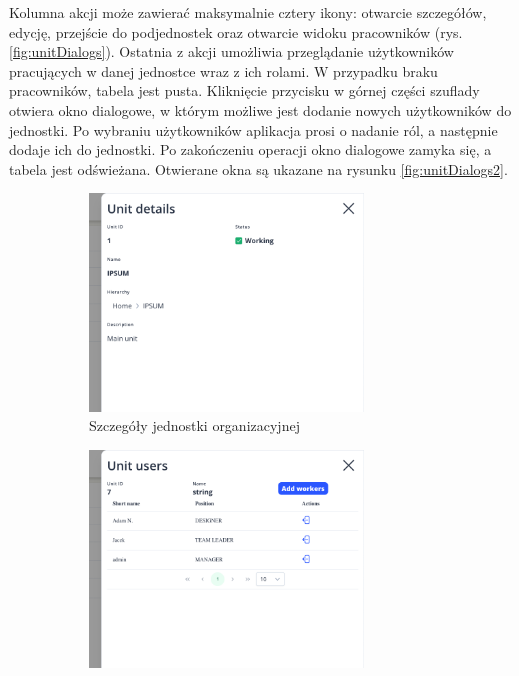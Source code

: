 Kolumna akcji może zawierać maksymalnie cztery ikony: otwarcie szczegółów, edycję, przejście do podjednostek oraz otwarcie widoku pracowników (rys. \ref{fig:unitDialogs}). Ostatnia z akcji umożliwia przeglądanie użytkowników pracujących w danej jednostce wraz z ich rolami. W przypadku braku pracowników, tabela jest pusta. Kliknięcie przycisku w górnej części szuflady otwiera okno dialogowe, w którym możliwe jest dodanie nowych użytkowników do jednostki. Po wybraniu użytkowników aplikacja prosi o nadanie ról, a następnie dodaje ich do jednostki. Po zakończeniu operacji okno dialogowe zamyka się, a tabela jest odświeżana. Otwierane okna są ukazane na rysunku \ref{fig:unitDialogs2}.

\begin{figure}[H]
    \centering
    \begin{subfigure}[b]{0.49\textwidth}
        \centering
        \includegraphics[width=0.8\textwidth, frame]{graf/front/unitDetails.png}
        \caption{Szczegóły jednostki organizacyjnej}
    \end{subfigure}
    \begin{subfigure}[b]{0.49\textwidth}
        \centering
        \includegraphics[width=0.8\textwidth, frame]{graf/front/unitWorkers.png}

\end{subfigure}
\end{figure}
